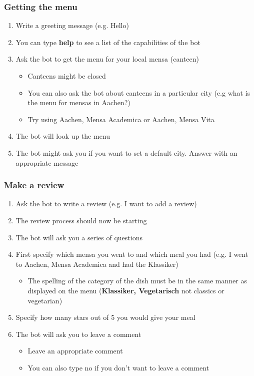 \subsubsection*{Getting the menu}
\begin{enumerate}
    \item Write a greeting message (e.g. Hello)
    \item You can type \textbf{help} to see a list of the capabilities of the bot
    \item Ask the bot to get the menu for your local mensa (canteen)
    \begin{itemize}
      \item Canteens might be closed
      \item You can also ask the bot about canteens in a particular city (e.g what is the menu for mensas in Aachen?)
      \item Try using Aachen, Mensa Academica or Aachen, Mensa Vita
    \end{itemize}
    \item The bot will look up the menu
    \item The bot might ask you if you want to set a default city. Answer with an appropriate message
\end{enumerate}
\subsubsection*{Make a review}
\begin{enumerate}
    \item Ask the bot to write a review (e.g. I want to add a review)
    \item The review process should now be starting 
    \item The bot will ask you a series of questions
    \item First specify which mensa you went to and which meal you had (e.g. I went to Aachen, Mensa Academica and had the Klassiker) 
    \begin{itemize}
      \item The spelling of the category of the dish must be in the same manner as displayed on the menu (\textbf{Klassiker, Vegetarisch} not classics or vegetarian)
    \end{itemize}
    \item Specify how many stars out of 5 you would give your meal
    \item The bot will ask you to leave a comment
    \begin{itemize}
        \item Leave an appropriate comment
        \item You can also type no if you don't want to leave a comment
      \end{itemize}
\end{enumerate}


